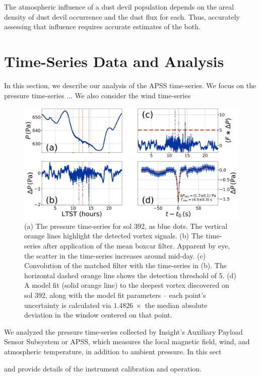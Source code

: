 \documentclass{aastex63}
\begin{document}

The atmospheric influence of a dust devil population depends on the areal density of dust devil occurrence and the dust flux for each. Thus, accurately assessing that influence requires accurate estimates of the both.

\section{Time-Series Data and Analysis}
In this section, we describe our analysis of the APSS time-series. We focus on the pressure time-series ... We also consider the wind time-series

\begin{figure}
    \centering
    \includegraphics[width=\textwidth]{figures/data_conditioning_and_fit.png}
    \caption{(a) The pressure time-series for sol 392, as blue dots. The vertical orange lines highlight the detected vortex signals. (b) The time-series after application of the mean boxcar filter. Apparent by eye, the scatter in the time-series increases around mid-day. (c) Convolution of the matched filter with the time-series in (b). The horizontal dashed orange line shows the detection threshold of 5. (d) A model fit (solid orange line) to the deepest vortex discovered on sol 392, along with the model fit parameters -- each point's uncertainty is calculated via $1.4826\ \times$ the median absolute deviation in the window centered on that point.}
    \label{fig:data_conditioning_and_fit}
\end{figure}

We analyzed the pressure time-series collected by Insight's Auxiliary Payload Sensor Subsystem or APSS, which measures the local magnetic field, wind, and atmospheric temperature, in addition to ambient pressure. In this sect

\citet{2018SSRv..214..109S} and \citet{2020NatGe..13..190B} provide details of the instrument calibration and operation. 
\end{document}
